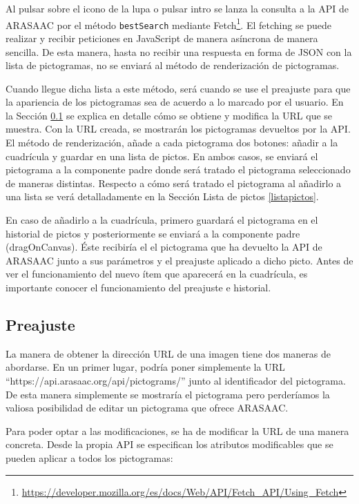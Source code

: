Al pulsar sobre el icono de la lupa o pulsar intro se lanza la consulta a la API de ARASAAC por el método \texttt{bestSearch} mediante Fetch\footnote{\url{https://developer.mozilla.org/es/docs/Web/API/Fetch_API/Using_Fetch}}. El fetching se puede realizar y recibir peticiones en JavaScript de manera asíncrona de manera sencilla. De esta manera, hasta no recibir una respuesta en forma de JSON con la lista de pictogramas, no se enviará al método de renderización de pictogramas. 

Cuando llegue dicha lista a este método, será cuando se use el preajuste para que la apariencia de los pictogramas sea de acuerdo a lo marcado por el usuario. En la Sección \ref{preajuste} se explica en detalle cómo se obtiene y modifica la URL que se muestra. Con la URL creada, se mostrarán los pictogramas devueltos por la API. El método de renderización, añade a cada pictograma dos botones: añadir a la cuadrícula y guardar en una lista de pictos. En ambos casos, se enviará el pictograma a la componente padre donde será tratado el pictograma seleccionado de maneras distintas. Respecto a cómo será tratado el pictograma al añadirlo a una lista se verá detalladamente en la Sección Lista de pictos \ref{listapictos}.

En caso de añadirlo a la cuadrícula, primero guardará el pictograma en el historial de pictos y posteriormente se enviará a la componente padre (dragOnCanvas).  Éste recibiría el el pictograma que ha devuelto la API de ARASAAC junto a sus parámetros y el preajuste aplicado a dicho picto. Antes de ver el funcionamiento del nuevo ítem que aparecerá en la cuadrícula, es importante conocer el funcionamiento del preajuste e historial.


\subsection{Preajuste}
\label{preajuste}

La manera de obtener la dirección URL de una imagen tiene dos maneras de abordarse. En un primer lugar, podría poner simplemente la URL “https://api.arasaac.org/api/pictograms/” junto al identificador del pictograma. De esta manera simplemente se mostraría el pictograma pero perderíamos la valiosa posibilidad de editar un pictograma que ofrece ARASAAC.

Para poder optar a las modificaciones, se ha de modificar la URL de una manera concreta. Desde la propia API se especifican los atributos modificables que se pueden aplicar a todos los pictogramas:  


